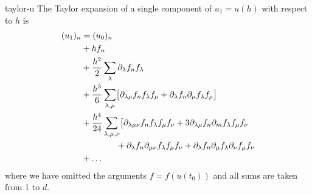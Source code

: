\begin{Lemma}{taylor-u}
  The Taylor expansion of a single component of $u_1 = u(h)$ with
  respect to $h$ is
  \begin{gather}
    \label{eq:taylor-u:1}
    \begin{split}
      (u_1)_n &= (u_0)_n
      \\& + h f_n
      \\& + \frac{h^2}2 \sum_\lambda \partial_{\lambda} f_n f_\lambda
      \\& + \frac{h^3}6 \sum_{\lambda,\mu} \bigl[\partial_{\lambda\mu} f_n f_\lambda f_\mu
      + \partial_{\lambda}f_n \partial_{\mu}f_\lambda f_\mu\bigr]
      \\& + \frac{h^4}{24} \sum_{\lambda,\mu,\nu}
      \bigl[\partial_{\lambda\mu\nu} f_n f_\lambda f_\mu f_\nu
      + 3\partial_{\lambda\mu} f_n \partial_{m}f_\lambda f_\mu f_\nu
      \\&\hphantom{+\frac{h^4}{24} \sum_{\lambda,\mu,\nu}}
      + \partial_{\lambda}f_n \partial_{\mu\nu} f_\lambda f_\mu f_\nu
      + \partial_{\lambda}f_n \partial_{\mu} f_\lambda \partial_{\nu} f_\mu f_\nu
      \\&+\dots
    \end{split}
  \end{gather}
  where we have omitted the arguments $f = f(u(t_0))$ and all sums are
  taken from 1 to $d$.
\end{Lemma}

